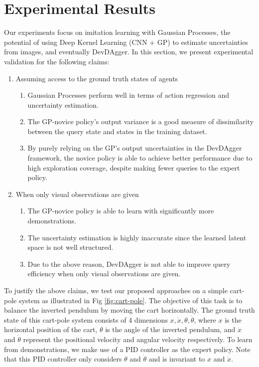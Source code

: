 \documentclass[11pt, reqno, letterpaper, twoside]{amsart}
\begin{document}
\section{Experimental Results}
Our experiments focus on imitation learning with Gaussian Processes, the potential of using Deep Kernel Learning (CNN + GP) to estimate uncertainties from images, and eventually DevDAgger. In this section, we present experimental validation for the following claims:
\begin{enumerate}
	\item Assuming access to the ground truth states of agents
	      \begin{enumerate}
		      \item Gaussian Processes perform well in terms of action regression and uncertainty estimation.
		      \item The GP-novice policy’s output variance is a good measure of dissimilarity between the query state and states in the training dataset.
		      \item By purely relying on the GP's output uncertainties in the DevDAgger framework, the novice policy is able to achieve better performance due to high exploration coverage, despite making fewer queries to the expert policy.
	      \end{enumerate}

	\item When only visual observations are given
	      \begin{enumerate}
		      \item The GP-novice policy is able to learn with significantly more demonstrations.
		      \item The uncertainty estimation is highly inaccurate since the learned latent space is not well structured.
		      \item Due to the above reason, DevDAgger is not able to improve query efficiency when only visual observations are given.
	      \end{enumerate}
\end{enumerate}

To justify the above claims, we test our proposed approaches on a simple cart-pole system as illustrated in Fig \ref{fig:cart-pole}. The objective of this task is to balance the inverted pendulum by moving the cart horizontally. The ground truth state of this cart-pole system consists of 4 dimensions $x, \Dot{x}, \theta, \Dot{\theta}$, where $x$ is the horizontal position of the cart, $\theta$ is the angle of the inverted pendulum, and $\Dot{x}$ and $\Dot{\theta}$ represent the positional velocity and angular velocity respectively. To learn from demonstrations, we make use of a PID controller as the expert policy. Note that this PID controller only considers $\theta$ and $\Dot{\theta}$ and is invariant to $x$ and $\Dot{x}$.
\end{document}
